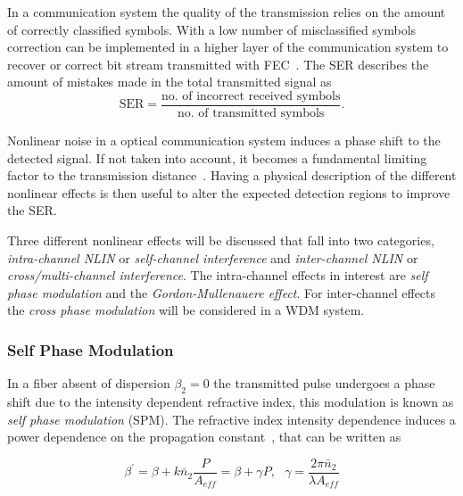  In a communication system the quality of the transmission relies on the amount of correctly classified symbols. With a low number of misclassified symbols correction can be implemented in a higher layer of the communication system to recover or correct bit stream transmitted with FEC~\cite{NLPNinCFO}. The SER describes the amount of mistakes made in the total transmitted signal as
 \begin{equation}
\text{SER} = \frac{\text{no. of incorrect received symbols}}{\text{no. of transmitted symbols}}.
\end{equation}




Nonlinear noise in a optical communication system induces a phase shift to the detected signal. If not taken into account, it becomes a fundamental limiting factor to the transmission distance~\cite{NLPNDSP}. Having a physical description of the different nonlinear effects is then useful to alter the expected detection regions to improve the SER.



 Three different nonlinear effects will be discussed that fall into  two categories, \emph{intra-channel NLIN} or \emph{self-channel interference} and \emph{inter-channel NLIN} or \emph{cross/multi-channel interference}. The intra-channel effects in interest are \emph{self phase modulation } and the \emph{Gordon-Mullenauere effect}. For inter-channel effects the \emph{cross phase modulation} will be considered in a WDM system.
  
\subsubsection{Self Phase Modulation}
In a fiber absent of dispersion $\beta_2=0$ the transmitted pulse undergoes a phase shift due to the intensity dependent refractive index, this modulation is known as \textit{self phase modulation }(SPM). The refractive index intensity dependence induces a power dependence on the propagation constant~\cite{FiberAgrawal}, that can be written as~\cite{le2015advanced}  

\begin{equation}
\beta^\prime=\beta+k\bar{n}_2\frac{P}{A_{eff}}=\beta+\gamma P ,\ \ \ \gamma = \frac{2\pi \bar{n}_2}{\lambda A_{eff}}
\label{eq:gammadef}
\end{equation}



